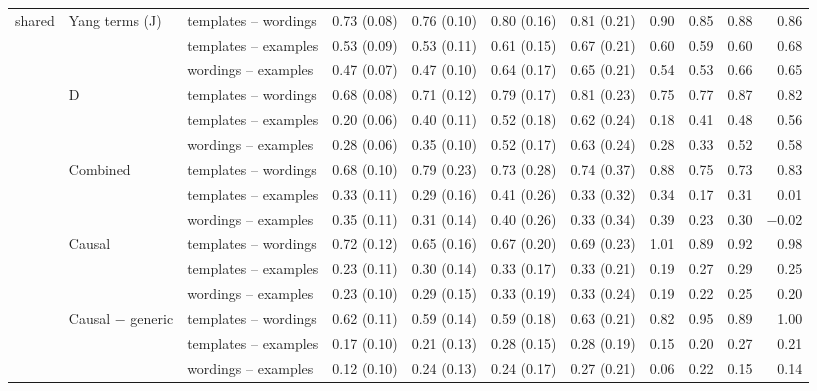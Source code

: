 \begin{tabular}{@{}lllrrrrrrrr@{}}
\midrule
shared & Yang terms (J) & templates -- wordings & 0.73 (0.08) & 0.76 (0.10) & 0.80 (0.16) & 0.81 (0.21) & 0.90 & 0.85 & 0.88 & 0.86 \\
 &  & templates -- examples & 0.53 (0.09) & 0.53 (0.11) & 0.61 (0.15) & 0.67 (0.21) & 0.60 & 0.59 & 0.60 & 0.68 \\
 &  & wordings -- examples & 0.47 (0.07) & 0.47 (0.10) & 0.64 (0.17) & 0.65 (0.21) & 0.54 & 0.53 & 0.66 & 0.65 \\
\addlinespace
 & D & templates -- wordings & 0.68 (0.08) & 0.71 (0.12) & 0.79 (0.17) & 0.81 (0.23) & 0.75 & 0.77 & 0.87 & 0.82 \\
 &  & templates -- examples & 0.20 (0.06) & 0.40 (0.11) & 0.52 (0.18) & 0.62 (0.24) & 0.18 & 0.41 & 0.48 & 0.56 \\
 &  & wordings -- examples & 0.28 (0.06) & 0.35 (0.10) & 0.52 (0.17) & 0.63 (0.24) & 0.28 & 0.33 & 0.52 & 0.58 \\
\addlinespace
 & Combined & templates -- wordings & 0.68 (0.10) & 0.79 (0.23) & 0.73 (0.28) & 0.74 (0.37) & 0.88 & 0.75 & 0.73 & 0.83 \\
 &  & templates -- examples & 0.33 (0.11) & 0.29 (0.16) & 0.41 (0.26) & 0.33 (0.32) & 0.34 & 0.17 & 0.31 & 0.01 \\
 &  & wordings -- examples & 0.35 (0.11) & 0.31 (0.14) & 0.40 (0.26) & 0.33 (0.34) & 0.39 & 0.23 & 0.30 & $-$0.02 \\
\addlinespace
 & Causal & templates -- wordings & 0.72 (0.12) & 0.65 (0.16) & 0.67 (0.20) & 0.69 (0.23) & 1.01 & 0.89 & 0.92 & 0.98 \\
 &  & templates -- examples & 0.23 (0.11) & 0.30 (0.14) & 0.33 (0.17) & 0.33 (0.21) & 0.19 & 0.27 & 0.29 & 0.25 \\
 &  & wordings -- examples & 0.23 (0.10) & 0.29 (0.15) & 0.33 (0.19) & 0.33 (0.24) & 0.19 & 0.22 & 0.25 & 0.20 \\
\addlinespace
 & Causal $-$ generic & templates -- wordings & 0.62 (0.11) & 0.59 (0.14) & 0.59 (0.18) & 0.63 (0.21) & 0.82 & 0.95 & 0.89 & 1.00 \\
 &  & templates -- examples & 0.17 (0.10) & 0.21 (0.13) & 0.28 (0.15) & 0.28 (0.19) & 0.15 & 0.20 & 0.27 & 0.21 \\
 &  & wordings -- examples & 0.12 (0.10) & 0.24 (0.13) & 0.24 (0.17) & 0.27 (0.21) & 0.06 & 0.22 & 0.15 & 0.14 \\
\bottomrule
\end{tabular}

